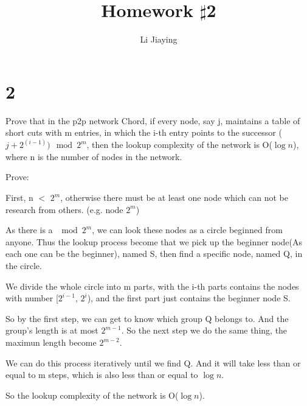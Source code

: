 \documentclass[10pt, a4paper, onecolumn, fleqn]{article}
\begin{document}
\title{Homework $\sharp$2}
\author{Li Jiaying}
\maketitle

\section*{2}
Prove that in the p2p network Chord, if every node, say j,
maintains a table of short cuts with m entries,
in which the i-th entry points to the successor ($j+2^{(i-1)}) \mod 2^m$,
then the lookup complexity of the network is O($\log n$),
where n is the number of nodes in the network.


Prove:

First, n $<$ $2^m$, otherwise there must be at least one node
which can not be research from others. (e.g. node $2^m$)

As there is a $\mod 2^m$, we can look these nodes as a circle
beginned from anyone. Thus the lookup process become that we pick up
the beginner node(As each one can be the beginner), named S,
then find a specific node, named Q, in the circle.

We divide the whole circle into m parts, 
with the i-th parts contains the nodes with number [$2^{i-1}$, $2^i$),
and the first part just contains the beginner node S.

So by the first step, we can get to know which group Q belongs to.
And the group's length is at most $2^{m-1}$.
So the next step we do the same thing, the maximun length become $2^{m-2}$.

We can do this process iteratively until we find Q. And it will take less than or equal to m steps, which is also less than or equal to $\log n$.

So the lookup complexity of the network is O($\log n$).
\end{document}
